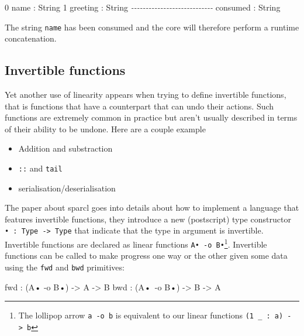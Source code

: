 \documentclass[
]{article}
\newenvironment{Shaded}{}{}
\newcommand{\CommentTok}[1]{\textcolor[rgb]{0.38,0.63,0.69}{\textit{#1}}}
\newcommand{\DataTypeTok}[1]{\textcolor[rgb]{0.56,0.13,0.00}{#1}}
\newcommand{\DecValTok}[1]{\textcolor[rgb]{0.25,0.63,0.44}{#1}}
\newcommand{\NormalTok}[1]{#1}
\newcommand{\OperatorTok}[1]{\textcolor[rgb]{0.40,0.40,0.40}{#1}}
\newcommand{\OtherTok}[1]{\textcolor[rgb]{0.00,0.44,0.13}{#1}}
\providecommand{\tightlist}{%
  \setlength{\itemsep}{0pt}\setlength{\parskip}{0pt}}
\begin{document}
\begin{Shaded}
\begin{Highlighting}[]
\DecValTok{0}\NormalTok{ name }\OperatorTok{:} \DataTypeTok{String}
\DecValTok{1}\NormalTok{ greeting }\OperatorTok{:} \DataTypeTok{String}
\CommentTok{{-}{-}{-}{-}{-}{-}{-}{-}{-}{-}{-}{-}{-}{-}{-}{-}{-}{-}{-}{-}{-}{-}{-}{-}{-}{-}{-}{-}}
\NormalTok{consumed }\OperatorTok{:} \DataTypeTok{String}
\end{Highlighting}
\end{Shaded}

The string \texttt{name} has been consumed and the core will therefore
perform a runtime concatenation.

\hypertarget{invertible-functions}{%
\subsection{Invertible functions}\label{invertible-functions}}

Yet another use of linearity appears when trying to define invertible
functions, that is functions that have a counterpart that can undo their
actions. Such functions are extremely common in practice but aren't
usually described in terms of their ability to be undone. Here are a
couple example

\begin{itemize}
\tightlist
\item
  Addition and substraction
\item
  \texttt{::} and \texttt{tail}
\item
  serialisation/deserialisation
\end{itemize}

The paper about sparcl\cite{invertible_functions} goes into details
about how to implement a language that features invertible functions,
they introduce a new (postscript) type constructor
\texttt{•\ :\ Type\ -\textgreater{}\ Type} that indicate that the type
in argument is invertible. Invertible functions are declared as linear
functions \texttt{A•\ -o\ B•}\footnote{The lollipop arrow
  \texttt{a\ -o\ b} is equivalent to our linear functions
  \texttt{(1\ \_\ :\ a)\ -\textgreater{}\ b}}. Invertible functions can
be called to make progress one way or the other given some data using
the \texttt{fwd} and \texttt{bwd} primitives:

\begin{Shaded}
\begin{Highlighting}[]
\NormalTok{fwd }\OperatorTok{:}\NormalTok{ (}\DataTypeTok{A}\NormalTok{• }\OperatorTok{{-}}\NormalTok{o }\DataTypeTok{B}\NormalTok{•) }\OtherTok{{-}\textgreater{}} \DataTypeTok{A} \OtherTok{{-}\textgreater{}} \DataTypeTok{B}
\NormalTok{bwd }\OperatorTok{:}\NormalTok{ (}\DataTypeTok{A}\NormalTok{• }\OperatorTok{{-}}\NormalTok{o }\DataTypeTok{B}\NormalTok{•) }\OtherTok{{-}\textgreater{}} \DataTypeTok{B} \OtherTok{{-}\textgreater{}} \DataTypeTok{A}
\end{Highlighting}
\end{Shaded}
\end{document}
